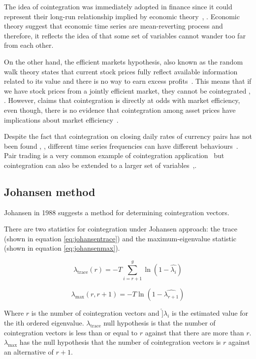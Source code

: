 The idea of cointegration was immediately adopted in finance since it could
represent their long-run relationship implied by economic
theory~\cite{laietAl1991}, \cite{lence+falk2005}.  Economic theory suggest that
economic time series are mean-reverting process and therefore, it reflects the
idea of that some set of variables cannot wander too far from each other. 

On the other hand, the efficient markets hypothesis, also known as the random
walk theory states that current stock prices fully reflect available information
related to its value and there is no way to earn excess profits~\cite{fama1970}.
This means that if we have stock prices from a jointly efficient market, they
cannot be cointegrated \cite{granger1986}, \cite{dwyer1992}. However,
\cite{richards1995} claims that cointegration is directly at odds with market
efficiency, even though, there is no evidence that cointegration among asset
prices have implications about market efficiency~\cite{lence+falk2005}.

Despite the fact that cointegration on closing daily rates of currency pairs has
not been found \cite{coleman1990}, \cite{copeland1991}, different time series
frequencies can have different behaviours~\cite{aldridge2009}. Pair trading is a
very common example of cointegration application~\cite{herlemont2003} but
cointegration can also be extended to a larger set of
variables~\cite{mukherjee1995},\cite{engle2004}.

\subsection{Johansen method}
Johansen in 1988 \cite{johansen1988} suggests a method for determining cointegration vectors. 

There are two statistics for cointegration under Johansen approach: the trace (shown in equation \ref{eq:johansentrace}) and the maximum-eigenvalue statistic (shown in equation \ref{eq:johansenmax}).

\begin{equation}
\label{eq:johansentrace}
\lambda_{\text{trace}} (r) = -T \sum_{i=r+1}^g \ln(1-\hat{\lambda_i})
\end{equation}


\begin{equation}
\label{eq:johansenmax}
\lambda_{\text{max}} (r,r+1) = -T \ln(1-\hat{\lambda_{r+1}})
\end{equation}


Where $r$ is the number of cointegration vectors and $\hat]{\lambda}_i$ is the estimated value for the ith ordered eigenvalue.  $\lambda_{\text{trace}}$ null hypothesis is that the number of cointegration vectors is less than or equal to $r$ against that there are more than $r$. $\lambda_{\text{max}}$ has the null hypothesis that the number of cointegration vectors is $r$ against an alternative of $r
+1$.


